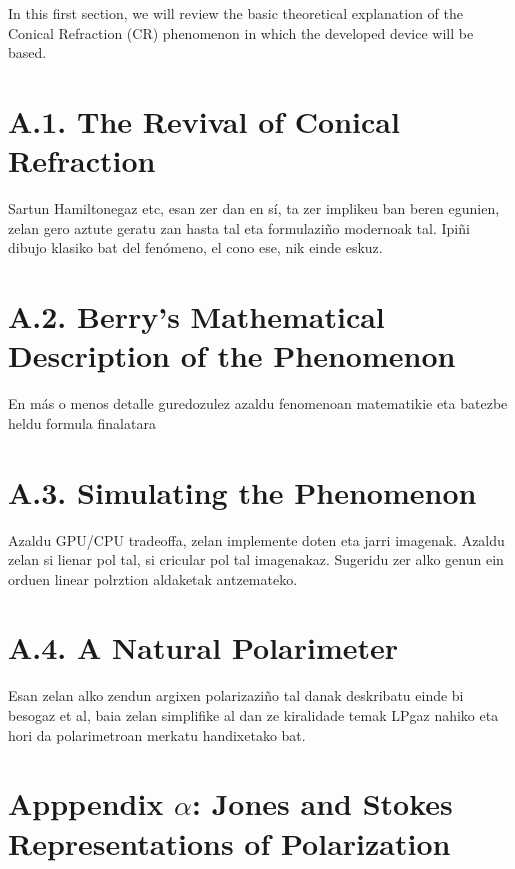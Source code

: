 \documentclass[11pt, a4paper, twoside]{article} %
\begin{document}
In this first section, we will review the basic theoretical explanation of the Conical Refraction (CR) phenomenon in which the developed device will be based.
 
\section*{A.1. The Revival of Conical Refraction }
Sartun Hamiltonegaz etc, esan zer dan en sí, ta zer implikeu ban beren egunien, zelan gero aztute geratu zan hasta tal eta formulaziño modernoak tal. Ipiñi dibujo klasiko bat del fenómeno, el cono ese, nik einde eskuz.

\section*{A.2. Berry's Mathematical Description of the Phenomenon }
En más o menos detalle guredozulez azaldu fenomenoan matematikie eta batezbe heldu formula finalatara

\section*{A.3. Simulating the Phenomenon }
Azaldu GPU/CPU tradeoffa, zelan implemente doten eta jarri imagenak. Azaldu zelan si lienar pol tal, si cricular pol tal imagenakaz. Sugeridu zer alko genun ein orduen linear polrztion aldaketak antzemateko.

\section*{A.4. A Natural Polarimeter}
Esan zelan alko zendun argixen polarizaziño tal danak deskribatu einde bi besogaz et al, baia zelan simplifike al dan ze kiralidade temak LPgaz nahiko eta hori da polarimetroan merkatu handixetako bat.

\section*{Apppendix $\alpha$: Jones and Stokes Representations of Polarization}
\end{document}
